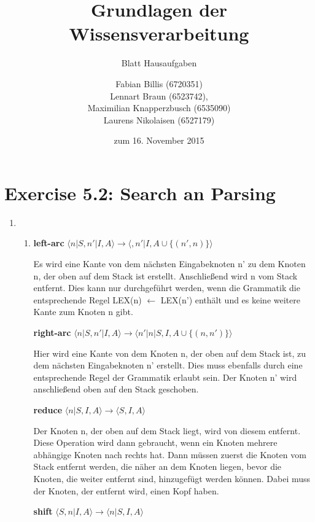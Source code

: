 \documentclass[a4paper]{scrartcl}
\title{Grundlagen der Wissensverarbeitung}
\subtitle{Blatt {\blattnr} Hausaufgaben}
\author{
    Fabian Billis (6720351) \\
    Lennart Braun (6523742), \\
    Maximilian Knapperzbusch (6535090) \\
    Laurens Nikolaisen (6527179) \\
}
\date{zum 16. November 2015}
\def \blattnr {5}
\begin{document}
\maketitle

\section*{Exercise \blattnr.2: Search an Parsing}

\begin{enumerate}
    \item
        \begin{enumerate}[label=(\alph*)]
            \item
            
            {
            
            \textbf{left-arc}   $\langle n|S,n'|I,A\rangle \rightarrow \langle,n'|I,A \cup \{(n',n)\}\rangle$
            
            Es wird eine Kante von dem nächsten Eingabeknoten n' zu dem Knoten n, der oben auf dem Stack ist erstellt.
            Anschließend wird n vom Stack entfernt. Dies kann nur durchgeführt werden, wenn die Grammatik die entsprechende Regel LEX(n) $\leftarrow$ LEX(n') enthält und es keine weitere Kante zum Knoten n gibt. 
            
            \textbf{right-arc} $\langle n |S, n' | I, A \rangle \rightarrow \langle n'|n|S, I, A \cup \{(n, n')\}\rangle$ 
            
            
            Hier wird eine Kante von dem Knoten n, der oben auf dem Stack ist, zu dem nächsten Eingabeknoten n' erstellt.
            Dies muss ebenfalls durch eine entsprechende Regel der Grammatik erlaubt sein. Der Knoten n' wird anschließend oben auf den Stack geschoben.
            
            \textbf{reduce} $\langle n|S,I,A\rangle \rightarrow \langle S,I,A \rangle$
            
            Der Knoten n, der oben auf dem Stack liegt, wird von diesem entfernt. Diese Operation wird dann gebraucht, wenn ein Knoten mehrere abhängige Knoten nach rechts hat. Dann müssen zuerst die Knoten vom Stack entfernt werden, die näher an dem Knoten  liegen, bevor die Knoten, die weiter entfernt sind, hinzugefügt werden können. Dabei muss der Knoten, der entfernt wird, einen Kopf haben.
            
            \textbf{shift} $\langle S,n|I,A\rangle \rightarrow \langle n|S,I,A \rangle$
            
}
\end{enumerate}
\end{enumerate}
\end{document}
